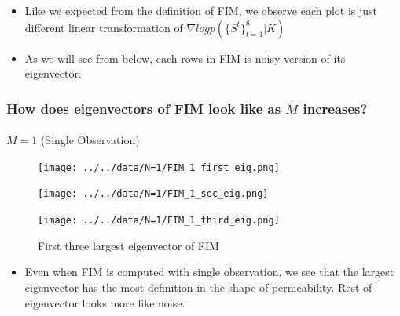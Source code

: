 \documentclass[
]{article}
\makeatletter
\let\oldparagraph\paragraph
\renewcommand{\paragraph}{
    \@ifstar
      \xxxParagraphStar
      \xxxParagraphNoStar
  }
\newcommand{\xxxParagraphStar}[1]{\oldparagraph*{#1}\mbox{}}
\newcommand{\xxxParagraphNoStar}[1]{\oldparagraph{#1}\mbox{}}
\providecommand{\tightlist}{%
  \setlength{\itemsep}{0pt}\setlength{\parskip}{0pt}}\usepackage{longtable,booktabs,array}
\makeatother
\begin{document}
\begin{itemize}
\tightlist
\item
  Like we expected from the definition of FIM, we observe each plot is
  just different linear transformation of
  \(\nabla log p(\{S^t\}^8_{t=1}|K)\)
\item
  As we will see from below, each rows in FIM is noisy version of its
  eigenvector.
\end{itemize}

\subsubsection{\texorpdfstring{How does eigenvectors of FIM look like as
\(M\)
increases?}{How does eigenvectors of FIM look like as M increases?}}\label{how-does-eigenvectors-of-fim-look-like-as-m-increases}

\paragraph{\texorpdfstring{\(M = 1\) (Single
Observation)}{M = 1 (Single Observation)}}\label{m-1-single-observation}

\begin{figure}

\begin{minipage}{0.33\linewidth}

\texttt{[image: ../../data/N=1/FIM\_1\_first\_eig.png]}

\end{minipage}%
%
\begin{minipage}{0.33\linewidth}

\texttt{[image: ../../data/N=1/FIM\_1\_sec\_eig.png]}

\end{minipage}%
%
\begin{minipage}{0.33\linewidth}

\texttt{[image: ../../data/N=1/FIM\_1\_third\_eig.png]}

\end{minipage}%

\caption{\label{fig-eig}First three largest eigenvector of FIM}

\end{figure}%

\begin{itemize}
\tightlist
\item
  Even when FIM is computed with single observation, we see that the
  largest eigenvector has the most definition in the shape of
  permeability. Rest of eigenvector looks more like noise.
\end{itemize}
\end{document}
